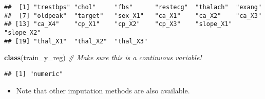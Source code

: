 \documentclass[
]{book}
\newenvironment{Shaded}{\begin{snugshade}}{\end{snugshade}}
\newcommand{\CommentTok}[1]{\textcolor[rgb]{0.56,0.35,0.01}{\textit{#1}}}
\newcommand{\DataTypeTok}[1]{\textcolor[rgb]{0.13,0.29,0.53}{#1}}
\newcommand{\KeywordTok}[1]{\textcolor[rgb]{0.13,0.29,0.53}{\textbf{#1}}}
\newcommand{\NormalTok}[1]{#1}
\newcommand{\OperatorTok}[1]{\textcolor[rgb]{0.81,0.36,0.00}{\textbf{#1}}}
\newcommand{\StringTok}[1]{\textcolor[rgb]{0.31,0.60,0.02}{#1}}
\providecommand{\tightlist}{%
  \setlength{\itemsep}{0pt}\setlength{\parskip}{0pt}}
\begin{document}
\begin{Shaded}
\end{Shaded}

\begin{verbatim}
##  [1] "trestbps" "chol"     "fbs"      "restecg"  "thalach"  "exang"   
##  [7] "oldpeak"  "target"   "sex_X1"   "ca_X1"    "ca_X2"    "ca_X3"   
## [13] "ca_X4"    "cp_X1"    "cp_X2"    "cp_X3"    "slope_X1" "slope_X2"
## [19] "thal_X1"  "thal_X2"  "thal_X3"
\end{verbatim}

\begin{Shaded}
\begin{Highlighting}[]
\KeywordTok{class}\NormalTok{(train\_y\_reg) }\CommentTok{\# Make sure this is a continuous variable!}
\end{Highlighting}
\end{Shaded}

\begin{verbatim}
## [1] "numeric"
\end{verbatim}

\begin{itemize}
\tightlist
\item
  Note that other imputation methods are also available.
\end{itemize}
\end{document}
